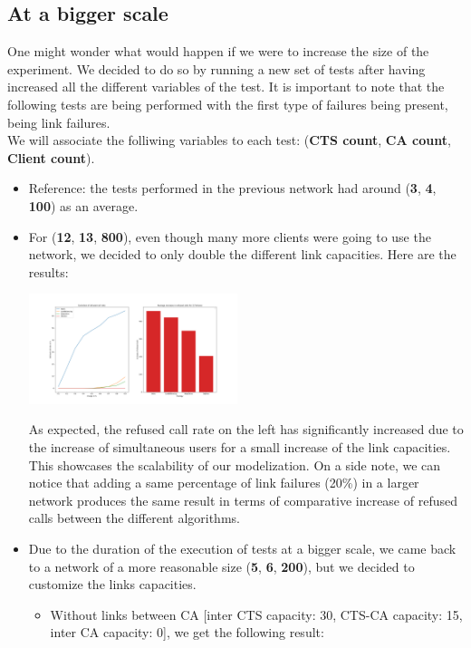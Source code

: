 \documentclass[lettersize,journal]{IEEEtran} %
\begin{document}
\subsection{At a bigger scale}
One might wonder what would happen if we were to increase the size of the experiment. We decided to do so by running a new set of tests after
having increased all the different variables of the test.
It is important to note that the following tests are being performed with the first type of failures being present, being link failures.\\
We will associate the folliwing variables to each test: (\textbf{CTS count}, \textbf{CA count}, \textbf{Client count}).
\begin{itemize}
        \item Reference: the tests performed in the previous network had around (\textbf{3}, \textbf{4}, \textbf{100}) as an average.
        \item For (\textbf{12}, \textbf{13}, \textbf{800}), even though many more clients were going to use the network,
        we decided to only double the different link capacities. Here are the results:
        \begin{center}
                \includegraphics[width=0.48\textwidth]{bigger_network.png}       
        \end{center}
        As expected, the refused call rate on the left has significantly increased due to the increase of simultaneous users for a small
        increase of the link capacities. This showcases the scalability of our modelization. On a side note, we can notice that adding
        a same percentage of link failures (20\%) in a larger network produces the same result in terms of comparative increase of refused calls
        between the different algorithms. 
        \item Due to the duration of the execution of tests at a bigger scale, we came back to a network of a more reasonable size
        (\textbf{5}, \textbf{6}, \textbf{200}), but we decided to customize the links capacities.
        \begin{itemize}
                \item Without links between CA [inter CTS capacity: 30, CTS-CA capacity: 15, inter CA capacity: 0], we get the following result:

\end{itemize}
\end{itemize}
\end{document}
